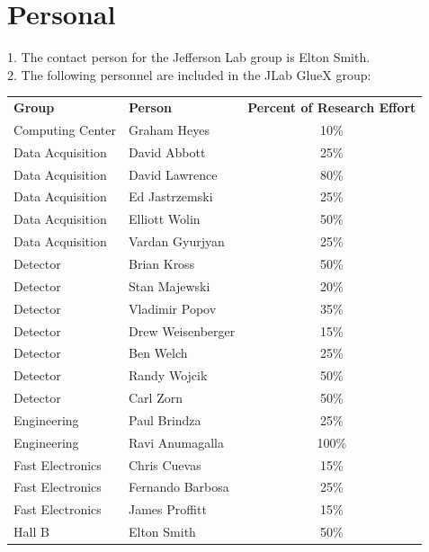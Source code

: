 \documentclass[oneside,12pt,letterpaper]{article}
\newcommand{\gx}{\mbox{GlueX}}
\newcommand{\instname}{Jefferson Lab}
\newcommand{\instabbr}{JLab}
\begin{document}
\section{\label{sec:personal}Personal}
\begin{flushleft}
1. The contact person for the \instname{} group is Elton Smith. \\
2. The following personnel are included in the \instabbr{} \gx{} group: 
\end{flushleft}
\begin{table}[h!]
\begin{center}
\begin{tabular}{llc} \\
\textbf{Group} & \textbf{Person} & \textbf{Percent of Research Effort} \\
Computing Center   & Graham Heyes   	        & 10\%   \\
Data Acquisition   & David Abbott               & 25\%  \\
Data Acquisition   & David Lawrence             & 80\%  \\
Data Acquisition   & Ed Jastrzemski		& 25\%   \\
Data Acquisition   & Elliott Wolin		& 50\%   \\
Data Acquisition   & Vardan Gyurjyan		& 25\%   \\
Detector           & Brian Kross		& 50\%   \\
Detector           & Stan Majewski		& 20\%   \\
Detector           & Vladimir Popov		& 35\%   \\
Detector           & Drew Weisenberger		& 15\%   \\
Detector           & Ben Welch		        & 25\%   \\
Detector           & Randy Wojcik		& 50\%   \\
Detector           & Carl Zorn 		        & 50\%   \\
Engineering        & Paul Brindza               & 25\%   \\
Engineering        & Ravi Anumagalla            & 100\%   \\
Fast Electronics   & Chris Cuevas		& 15\%  \\
Fast Electronics   & Fernando Barbosa		& 25\%  \\
Fast Electronics   & James Proffitt		& 15\%  \\
Hall B             & Elton Smith                & 50\%   \\

\end{tabular}
\end{center}
\end{table}
\end{document}
